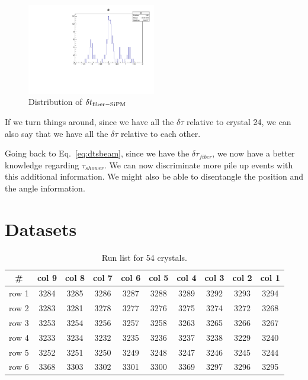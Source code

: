 \begin{figure}[htbp]
\centering
\includegraphics[width=0.5\textwidth]{pics/grid.pdf} 
\caption{Distribution of $\delta t_{\rm{fiber-SiPM}}$}\label{fig:grid}
\end{figure}

If we turn things around, since we have all the $\delta \tau$ relative to crystal 24, we can also say that we have all the $\delta \tau$
relative to each other.

Going back to Eq.~\ref{eq:dtsbeam}, since we have the $\delta \tau_{fiber}$, we now have a better knowledge 
regarding $\tau_{shower}$. We can now discriminate more pile up events with this additional information.
We might also be able to disentangle the position and the angle information.



\section{Datasets}

\begin{table}[htbp]
\centering
\caption{Run list for 54 crystals.}
\begin{tabular}{|c|c|c|c|c|c|c|c|c|c|}
\hline 
\#    & col 9 & col 8 & col 7 & col 6 & col 5 & col 4 & col 3 & col 2 & col 1 \\
\hline
row 1 & 3284  & 3285  & 3286  & 3287  & 3288  & 3289  & 3292  & 3293  & 3294  \\
\hline
row 2 & 3283  & 3281  & 3278  & 3277  & 3276  & 3275  & 3274  & 3272  & 3268  \\
\hline
row 3 & 3253  & 3254  & 3256  & 3257  & 3258  & 3263  & 3265  & 3266  & 3267  \\
\hline
row 4 & 3233  & 3234  & 3232  & 3235  & 3236  & 3237  & 3238  & 3229  & 3240  \\
\hline
row 5 & 3252  & 3251  & 3250  & 3249  & 3248  & 3247  & 3246  & 3245  & 3244  \\
\hline
row 6 & 3368  & 3303  & 3302  & 3301  & 3300  & 3369  & 3297  & 3296  & 3295 \\
\hline
\end{tabular} 
\label{tab:runlist}
\end{table}

